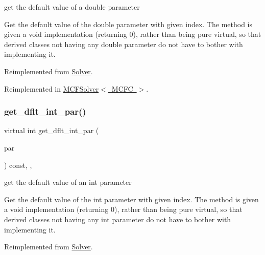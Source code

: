 get the default value of a double parameter 

Get the default value of the double parameter with given index. The method is given a void implementation (returning 0), rather than being pure virtual, so that derived classes not having any double parameter do not have to bother with implementing it. 

Reimplemented from \mbox{\hyperlink{class_s_m_spp__di__unipi__it_1_1_solver_a465a771c115acf8d5f4e32e22f003014}{Solver}}.



Reimplemented in \mbox{\hyperlink{class_s_m_spp__di__unipi__it_1_1_m_c_f_solver_a465a771c115acf8d5f4e32e22f003014}{M\+C\+F\+Solver$<$ M\+C\+F\+C $>$}}.

\mbox{\label{class_s_m_spp__di__unipi__it_1_1_c_d_a_solver_a75dd1491b74c4b9476755e061dce3e04}} 
\subsubsection{\texorpdfstring{get\+\_\+dflt\+\_\+int\+\_\+par()}{get\_dflt\_int\_par()}}
{\footnotesize\ttfamily virtual int get\+\_\+dflt\+\_\+int\+\_\+par (\begin{DoxyParamCaption}\item[{const \mbox{\hyperlink{class_s_m_spp__di__unipi__it_1_1_thin_compute_interface_aa3d710629ad8c434286726ad810c3b47}{idx\+\_\+type}}}]{par }\end{DoxyParamCaption}) const\hspace{0.3cm}{\ttfamily [inline]}, {\ttfamily [override]}, {\ttfamily [virtual]}}



get the default value of an int parameter 

Get the default value of the int parameter with given index. The method is given a void implementation (returning 0), rather than being pure virtual, so that derived classes not having any int parameter do not have to bother with implementing it. 

Reimplemented from \mbox{\hyperlink{class_s_m_spp__di__unipi__it_1_1_solver_a75dd1491b74c4b9476755e061dce3e04}{Solver}}.



